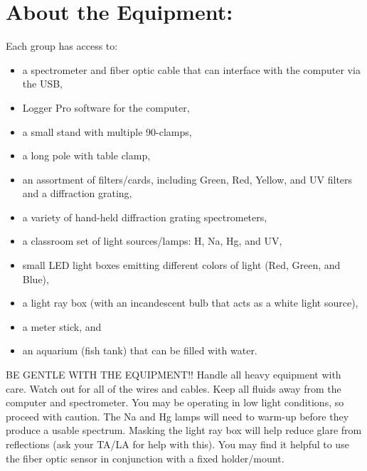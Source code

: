 \section*{About the Equipment:}
Each group has access to:
\begin{itemize}
\itemsep-0.3em
\item a spectrometer and fiber optic cable that can interface with the computer via the USB,
\item Logger Pro software for the computer,
\item a small stand with multiple 90-clamps,
\item a long pole with table clamp,
\item an assortment of filters/cards, including Green, Red, Yellow, and UV filters and a diffraction grating,
\item a variety of hand-held diffraction grating spectrometers,
\item a classroom set of light sources/lamps: H, Na, Hg, and UV,
\item small LED light boxes emitting different colors of light (Red, Green, and Blue),
\item a light ray box (with an incandescent bulb that acts as a white light source),
\item a meter stick, and
\item an aquarium (fish tank) that can be filled with water.
\end{itemize}
BE GENTLE WITH THE EQUIPMENT!! 
Handle all heavy equipment with care. 
Watch out for all of the wires and cables. 
Keep all fluids away from the computer and spectrometer.
You may be operating in low light conditions, so proceed with caution. 
The Na and Hg lamps will need to warm-up before they produce a usable spectrum. 
Masking the light ray box will help reduce glare from reflections (ask your TA/LA for help with this). 
You may find it helpful to use the fiber optic sensor in conjunction with a fixed holder/mount.

